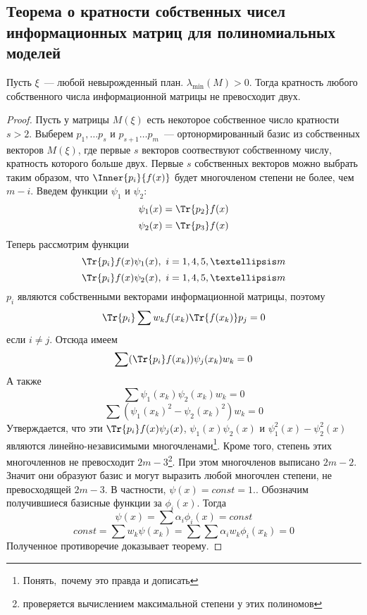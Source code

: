  \subsection{Теорема о кратности собственных чисел информационных матриц для полиномиальных моделей}
 \begin{thm}
Пусть $\xi$ — любой невырожденный план. $\lambda_{\min}(M) > 0$. Тогда кратность любого собственного числа информационной матрицы не превосходит двух.
 \end{thm}
 \begin{proof}
Пусть у матрицы $M(\xi)$ есть некоторое собственное число кратности $s > 2$. Выберем $p_1,…p_s$ и $p_{s+1}…p_m$ — ортонормированный базис из собственных векторов $M(\xi)$, где первые $s$ векторов соотвествуют собственному числу, кратность которого больше двух. Первые $s$ собственных векторов можно выбрать таким образом, что
$\Inner{p_i}{f(x)}$ будет многочленом степени не более, чем $m-i$. Введем функции $\psi_1$ и $\psi_2$:
$$ \psi_1(x) = \Tr{p_2}f(x)$$
$$ \psi_2(x) = \Tr{p_3}f(x)$$
Теперь рассмотрим функции
$$\Tr{p_i}f(x) \psi_1(x), i = 1, 4,5,…m$$
$$\Tr{p_i}f(x) \psi_2(x), i = 1, 4,5,…m$$
$p_i$ являются собственными векторами информационной матрицы, поэтому
$$\Tr{p_i} \sum w_k f(x_k)\Tr{f(x_k)}p_j = 0$$
если $i \neq j$. Отсюда имеем
$$ \sum (\Tr{p_i} f(x_k)) \psi_j(x_k) w_k = 0$$
А также 
$$\sum \psi_1(x_k)\psi_2(x_k) w_k = 0$$
$$\sum (\psi_1(x_k)^2 - \psi_2(x_k)^2) w_k = 0$$
Утверждается, что эти $\Tr{p_i}f(x)\psi_j(x)$, $\psi_1(x)\psi_2(x)$ и $\psi_1^2(x) - \psi_2^2(x)$ являются линейно-независимыми многочленами\footnote{Понять, почему это правда и дописать}. Кроме того, степень этих многочленнов не превосходит $2m-3$\footnote{проверяется вычислением максимальной степени у этих полиномов}. При этом многочленов выписано $2m-2$. Значит они образуют базис и могут выразить любой многочлен степени, не превосходящей $2m-3$. В частности, $\psi(x) = const = 1.$. Обозначим получившиеся базисные функции за $\phi_i(x)$. Тогда 
$$\psi(x) = \sum \alpha_i \phi_i(x) = const$$
$$const = \sum w_k \psi(x_k) = \sum \sum \alpha_i w_k \phi_i(x_k) = 0$$
Полученное противоречие доказывает теорему.
 \end{proof}


